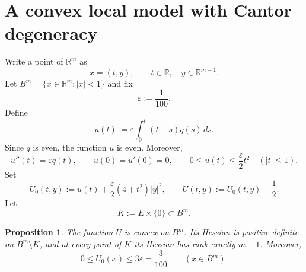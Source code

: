 \documentclass[11pt]{amsart}
\newtheorem{proposition}[theorem]{Proposition}
\theoremstyle{remark}
\newcommand{\R}{\mathbb R}
\begin{document}
\section{A convex local model with Cantor degeneracy}

Write a point of $\R^m$ as
\[
 x=(t,y),\qquad t\in\R,\quad y\in\R^{m-1}.
\]
Let $B^m=\{x\in\R^m:|x|<1\}$ and fix
\[
 \varepsilon:=\frac1{100}.
\]
Define
\begin{equation}\label{eq:u-definition}
 u(t):=\varepsilon\int_0^t(t-s)q(s)\,ds.
\end{equation}
Since $q$ is even, the function $u$ is even.  Moreover,
\begin{equation}\label{eq:u-properties}
 u''(t)=\varepsilon q(t),\qquad u(0)=u'(0)=0,
 \qquad 0\leq u(t)\leq\frac\varepsilon2t^2
 \quad (|t|\leq1).
\end{equation}
Set
\begin{equation}\label{eq:U0-definition}
 U_0(t,y):=u(t)+\frac\varepsilon2(4+t^2)|y|^2,
 \qquad
 U(t,y):=U_0(t,y)-\frac12.
\end{equation}
Let
\begin{equation}\label{eq:K-definition}
 K:=E\times\{0\}\subset B^m.
\end{equation}

\begin{proposition}\label{prop:local-model}
The function $U$ is convex on $B^m$.  Its Hessian is positive definite on $B^m\setminus K$, and at every point of $K$ its Hessian has rank exactly $m-1$.  Moreover,
\begin{equation}\label{eq:U0-bound}
 0\leq U_0(x)\leq3\varepsilon=\frac3{100}
 \qquad (x\in B^m).
\end{equation}
\end{proposition}
\end{document}
